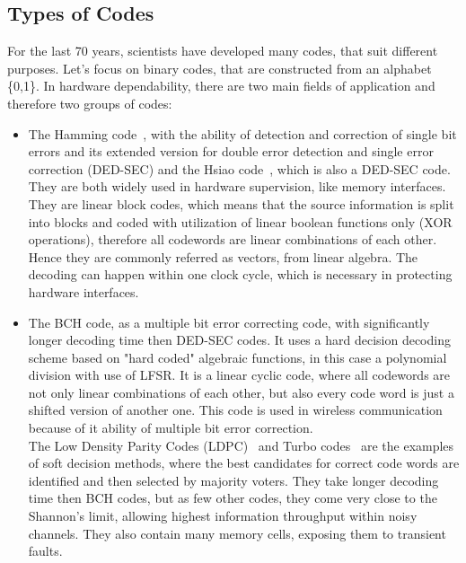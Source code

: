\subsection{Types of Codes}
For the last 70 years, scientists have developed many codes, that suit different purposes. Let's focus on binary codes, that are constructed from an alphabet \{0,1\}. In hardware dependability, there are two main fields of application and therefore two groups of codes:
\begin{itemize}
\item The Hamming code~\cite{art:Hamming}, with the ability of detection and correction of single bit errors and its extended version for double error detection and single error correction (DED-SEC) and the Hsiao code~\cite{art:Hsiao}, which is also a DED-SEC code. They are both widely used in hardware supervision, like memory interfaces. They are linear block codes, which means that the source information is split into blocks and coded with utilization of linear boolean functions only (XOR operations), therefore all codewords are linear combinations of each other. Hence they are commonly referred as vectors, from linear algebra. The decoding can happen within one clock cycle, which is necessary in protecting hardware interfaces.  
\item The BCH code, as a multiple bit error correcting code, with significantly longer decoding time then DED-SEC codes. It uses a hard decision decoding scheme based on "hard coded" algebraic functions, in this case a polynomial division with use of LFSR. It is a linear cyclic code, where all codewords are not only linear combinations of each other, but also every code word is just a shifted version of another one. This code is used in wireless communication because of it ability of multiple bit error correction.\\
The Low Density Parity Codes (LDPC)~\cite{art:LDPC} and Turbo codes~\cite{art:turbo} are the examples of soft decision methods, where the best candidates for correct code words are identified and then selected by majority voters. They take longer decoding time then BCH codes, but as few other codes, they come very close to the Shannon's limit, allowing highest information throughput within noisy channels. They also contain many memory cells, exposing them to transient faults.\\
\end{itemize}

